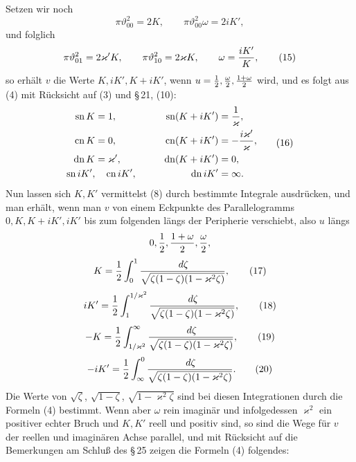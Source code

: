 \documentclass[11pt]{article}
\providecommand{\dd}{\,d}
\providecommand{\tht}{\vartheta}
\providecommand{\sn}{\operatorname{sn}}
\providecommand{\cn}{\operatorname{cn}}
\providecommand{\dn}{\operatorname{dn}}
\begin{document}
Setzen wir noch
\begin{equation}
\pi\tht_{00}^{2}=2K,
\qquad
\pi\tht_{00}^{2}\omega=2iK',
\tag{14}
\end{equation}
und folglich
\begin{equation}
\pi\tht_{01}^{2}=2\varkappa'K,
\qquad
\pi\tht_{10}^{2}=2\varkappa K,
\qquad
\omega={iK'\over K},
\tag{15}
\end{equation}
so erhält $v$ die Werte $K,iK',K+iK'$, wenn $u={1\over2},{\omega\over2},{1+\omega\over2}$ wird, und es folgt aus (4) mit Rücksicht auf (3) und \S\,21, (10):
\begin{equation}
\begin{aligned}
\sn K&=1,&\qquad \sn(K+iK')&={1\over\varkappa},\\
\cn K&=0,&\qquad \cn(K+iK')&=-{i\varkappa'\over\varkappa},\\
\dn K&=\varkappa',&\qquad \dn(K+iK')&=0,\\
\sn iK',&\quad \cn iK',&\quad \dn iK'&=\infty.
\end{aligned}
\tag{16}
\end{equation}
Nun lassen sich $K,K'$ vermittelst (8) durch bestimmte Integrale ausdrücken, und man erhält, wenn man $v$ von einem Eckpunkte des Parallelogramms $0,K,K+iK',iK'$ bis zum folgenden längs der Peripherie verschiebt, also $u$ längs
\[
0,{1\over2},{1+\omega\over2},{\omega\over2},
\]
\begin{equation}
K={1\over2}\int_0^1 {\dd\zeta\over\sqrt{\zeta(1-\zeta)(1-\varkappa^2\zeta)}},
\tag{17}
\end{equation}
\begin{equation}
iK'={1\over2}\int_1^{1/\varkappa^2}{\dd\zeta\over\sqrt{\zeta(1-\zeta)(1-\varkappa^2\zeta)}},
\tag{18}
\end{equation}
\begin{equation}
-K={1\over2}\int_{1/\varkappa^2}^{\infty}{\dd\zeta\over\sqrt{\zeta(1-\zeta)(1-\varkappa^2\zeta)}},
\tag{19}
\end{equation}
\begin{equation}
-iK'={1\over2}\int_\infty^0 {\dd\zeta\over\sqrt{\zeta(1-\zeta)(1-\varkappa^2\zeta)}}.
\tag{20}
\end{equation}
Die Werte von $\sqrt\zeta$, $\sqrt{1-\zeta}$, $\sqrt{1-\varkappa^2\zeta}$ sind bei diesen Integrationen durch die Formeln (4) bestimmt. Wenn aber $\omega$ rein imaginär und infolgedessen $\varkappa^2$ ein positiver echter Bruch und $K,K'$ reell und positiv sind, so sind die Wege für $v$ der reellen und imaginären Achse parallel, und mit Rücksicht auf die Bemerkungen am Schluß des \S\,25 zeigen die Formeln (4) folgendes:
\end{document}
